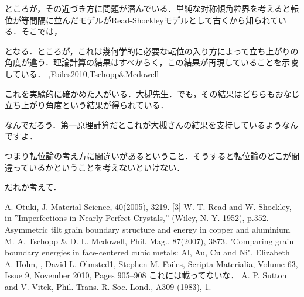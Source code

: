 ところが，その近づき方に問題が潜んでいる．単純な対称傾角粒界を考えると転位が等間隔に並んだモデルがRead-Shockleyモデルとして古くから知られている．そこでは，

となる．ところが，これは幾何学的に必要な転位の入り方によって立ち上がりの角度が違う．理論計算の結果はすべからく，この結果が再現していることを示唆している．
\cite{Hasson@Goux},{Foiles2010},{Tschopp&Mcdowell}

これを実験的に確かめた人がいる．大槻先生．でも，その結果はどちらもおなじ立ち上がり角度という結果が得られている．

なんでだろう．第一原理計算だとこれが大槻さんの結果を支持しているようなんですよ．

つまり転位論の考え方に間違いがあるということ．そうすると転位論のどこが間違っているかということを考えないといけない．

だれか考えて．

A. Otuki, J. Material Science, 40(2005), 3219.
[3] W. T. Read and W. Shockley, in ”Imperfections in Nearly Perfect Crystals,” (Wiley, N. Y. 1952), p.352.
Asymmetric tilt grain boundary structure and energy in copper and aluminium
M. A. Tschopp & D. L. Mcdowell, Phil. Mag., 87(2007), 3873.
\bibitem[Foiles2010] "Comparing grain boundary energies in face-centered cubic metals: Al, Au, Cu and Ni", Elizabeth A. Holm, , David L. Olmsted1, Stephen M. Foiles, Scripta Materialia, Volume 63, Issue 9, November 2010, Pages 905–908 これには載ってないな．
A. P. Sutton and V. Vitek, Phil. Trans. R. Soc. Lond., A309 (1983), 1.

